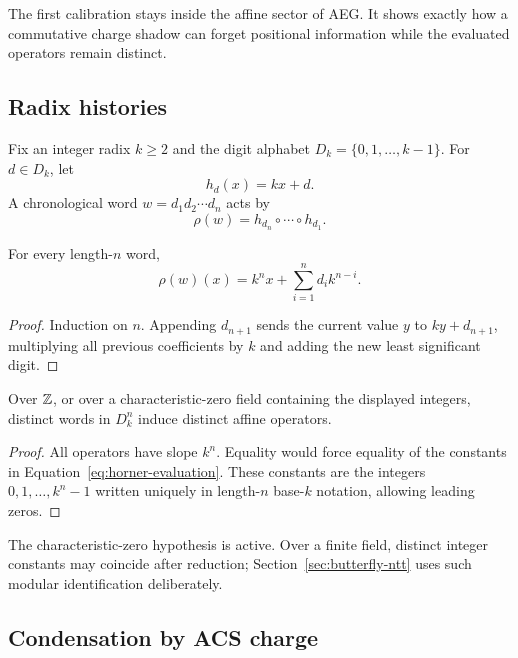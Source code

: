 The first calibration stays inside the affine sector of AEG.  It shows exactly
how a commutative charge shadow can forget positional information while the
evaluated operators remain distinct.

\subsection{Radix histories}

Fix an integer radix $k\ge2$ and the digit alphabet
$D_k=\{0,1,\ldots,k-1\}$.  For $d\in D_k$, let
\[
  h_d(x)=kx+d.
\]
A chronological word $w=d_1d_2\cdots d_n$ acts by
\[
  \rho(w)=h_{d_n}\circ\cdots\circ h_{d_1}.
\]

\begin{proposition}
\label{prop:horner-evaluation}
For every length-$n$ word,
\begin{equation}
  \rho(w)(x)
  =k^n x+\sum_{i=1}^{n}d_i k^{n-i}.
  \label{eq:horner-evaluation}
\end{equation}
\end{proposition}

\begin{proof}
Induction on $n$.  Appending $d_{n+1}$ sends the current value $y$ to
$ky+d_{n+1}$, multiplying all previous coefficients by $k$ and adding the new
least significant digit.
\end{proof}

\begin{theorem}
\label{thm:radix-word-injectivity}
Over $\mathbb{Z}$, or over a characteristic-zero field containing the displayed
integers, distinct words in $D_k^n$ induce distinct affine operators.
\end{theorem}

\begin{proof}
All operators have slope $k^n$.  Equality would force equality of the constants
in Equation~\eqref{eq:horner-evaluation}.  These constants are the integers
$0,1,\ldots,k^n-1$ written uniquely in length-$n$ base-$k$ notation, allowing
leading zeros.
\end{proof}

The characteristic-zero hypothesis is active.  Over a finite field, distinct
integer constants may coincide after reduction; Section~\ref{sec:butterfly-ntt}
uses such modular identification deliberately.

\subsection{Condensation by ACS charge}

